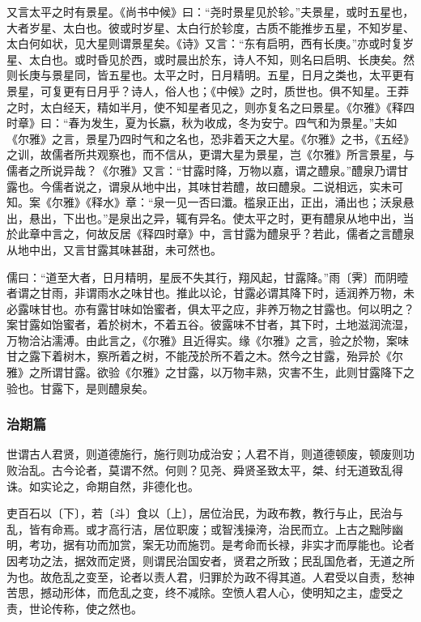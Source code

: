 \documentclass[]{article}
\begin{document}
又言太平之时有景星。《尚书中候》曰：``尧时景星见於轸。''夫景星，或时五星也，大者岁星、太白也。彼或时岁星、太白行於轸度，古质不能推步五星，不知岁星、太白何如状，见大星则谓景星矣。《诗》又言：``东有启明，西有长庚。''亦或时复岁星、太白也。或时昏见於西，或时晨出於东，诗人不知，则名曰启明、长庚矣。然则长庚与景星同，皆五星也。太平之时，日月精明。五星，日月之类也，太平更有景星，可复更有日月乎？诗人，俗人也；《中候》之时，质世也。俱不知星。王莽之时，太白经天，精如半月，使不知星者见之，则亦复名之曰景星。《尔雅》《释四时章》曰：``春为发生，夏为长嬴，秋为收成，冬为安宁。四气和为景星。''夫如《尔雅》之言，景星乃四时气和之名也，恐非着天之大星。《尔雅》之书，《五经》之训，故儒者所共观察也，而不信从，更谓大星为景星，岂《尔雅》所言景星，与儒者之所说异哉？《尔雅》又言：``甘露时降，万物以嘉，谓之醴泉。''醴泉乃谓甘露也。今儒者说之，谓泉从地中出，其味甘若醴，故曰醴泉。二说相远，实未可知。案《尔雅》《释水》章：``泉一见一否曰瀸。槛泉正出，正出，涌出也；沃泉悬出，悬出，下出也。''是泉出之异，辄有异名。使太平之时，更有醴泉从地中出，当於此章中言之，何故反居《释四时章》中，言甘露为醴泉乎？若此，儒者之言醴泉从地中出，又言甘露其味甚甜，未可然也。

儒曰：``道至大者，日月精明，星辰不失其行，翔风起，甘露降。''雨〔霁〕而阴曀者谓之甘雨，非谓雨水之味甘也。推此以论，甘露必谓其降下时，适润养万物，未必露味甘也。亦有露甘味如饴蜜者，俱太平之应，非养万物之甘露也。何以明之？案甘露如饴蜜者，着於树木，不着五谷。彼露味不甘者，其下时，土地滋润流湿，万物洽沾濡溥。由此言之，《尔雅》且近得实。缘《尔雅》之言，验之於物，案味甘之露下着树木，察所着之树，不能茂於所不着之木。然今之甘露，殆异於《尔雅》之所谓甘露。欲验《尔雅》之甘露，以万物丰熟，灾害不生，此则甘露降下之验也。甘露下，是则醴泉矣。

\hypertarget{header-n756}{%
\subsubsection{治期篇}\label{header-n756}}

世谓古人君贤，则道德施行，施行则功成治安；人君不肖，则道德顿废，顿废则功败治乱。古今论者，莫谓不然。何则？见尧、舜贤圣致太平，桀、纣无道致乱得诛。如实论之，命期自然，非德化也。

吏百石以〔下〕，若〔斗〕食以〔上〕，居位治民，为政布教，教行与止，民治与乱，皆有命焉。或才高行洁，居位职废；或智浅操洿，治民而立。上古之黜陟幽明，考功，据有功而加赏，案无功而施罚。是考命而长禄，非实才而厚能也。论者因考功之法，据效而定贤，则谓民治国安者，贤君之所致；民乱国危者，无道之所为也。故危乱之变至，论者以责人君，归罪於为政不得其道。人君受以自责，愁神苦思，撼动形体，而危乱之变，终不减除。空愤人君人心，使明知之主，虚受之责，世论传称，使之然也。
\end{document}
